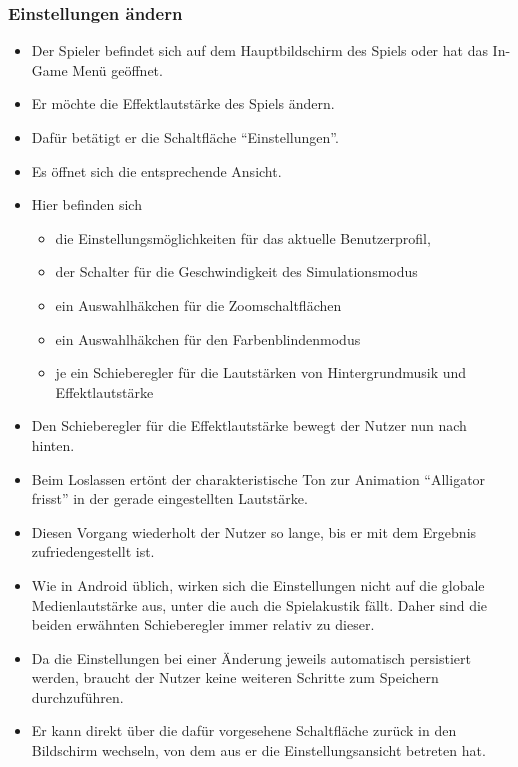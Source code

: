 \subsubsection{Einstellungen ändern}
\begin{itemize}
\item Der Spieler befindet sich auf dem Hauptbildschirm des Spiels oder hat das In-Game Menü 
geöffnet.
\item Er möchte die Effektlautstärke des Spiels ändern.
\item Dafür betätigt er die Schaltfläche "`Einstellungen"'.
\item Es öffnet sich die entsprechende Ansicht.
\item Hier befinden sich
	\begin{itemize}
	\item die Einstellungsmöglichkeiten für das aktuelle Benutzerprofil, 
	\item der Schalter für die Geschwindigkeit des Simulationsmodus
	\item ein Auswahlhäkchen für die Zoomschaltflächen
	\item ein Auswahlhäkchen für den Farbenblindenmodus
	\item je ein Schieberegler für die Lautstärken von Hintergrundmusik und Effektlautstärke
	\end{itemize}
\item Den Schieberegler für die Effektlautstärke bewegt der Nutzer nun nach hinten.
\item Beim Loslassen ertönt der charakteristische Ton zur Animation "`Alligator frisst"' in der
gerade eingestellten Lautstärke.
\item Diesen Vorgang wiederholt der Nutzer so lange, bis er mit dem Ergebnis zufriedengestellt ist.
\item Wie in Android üblich, wirken sich die Einstellungen nicht auf die globale Medienlautstärke
aus, unter die auch die Spielakustik fällt. Daher sind die beiden erwähnten Schieberegler immer relativ zu dieser. 
\item Da die Einstellungen bei einer Änderung jeweils automatisch persistiert werden, braucht der
Nutzer keine weiteren Schritte zum Speichern durchzuführen.
\item Er kann direkt über die dafür vorgesehene Schaltfläche zurück in den Bildschirm
wechseln, von dem aus er die Einstellungsansicht betreten hat.
\end{itemize}
